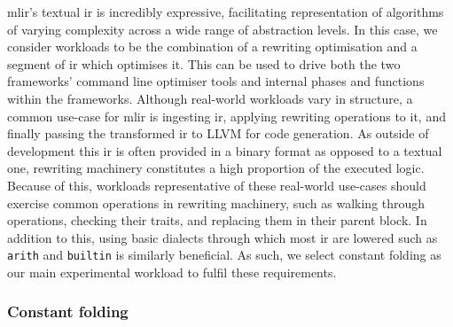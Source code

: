 \ac{mlir}'s textual \ac{ir} is incredibly expressive, facilitating representation of algorithms of varying complexity across a wide range of abstraction levels.
In this case, we consider workloads to be the combination of a rewriting optimisation and a segment of \ac{ir} which optimises it. This can be used to drive both the two frameworks' command line optimiser tools and internal phases and functions within the frameworks.
Although real-world workloads vary in structure, a common use-case for \ac{mlir} is ingesting \ac{ir}, applying rewriting operations to it, and finally passing the transformed \ac{ir} to LLVM for code generation. As outside of development this \ac{ir} is often provided in a binary format as opposed to a textual one, rewriting machinery constitutes a high proportion of the executed logic.
Because of this, workloads representative of these real-world use-cases should exercise common operations in rewriting machinery, such as walking through operations, checking their traits, and replacing them in their parent block. In addition to this, using basic dialects through which most \acs{ir} are lowered such as \texttt{arith} and \texttt{builtin} is similarly beneficial.
As such, we select constant folding as our main experimental workload to fulfil these requirements.

\subsubsection{Constant folding}
\label{sssec:experimental-workload-constant-folding}

